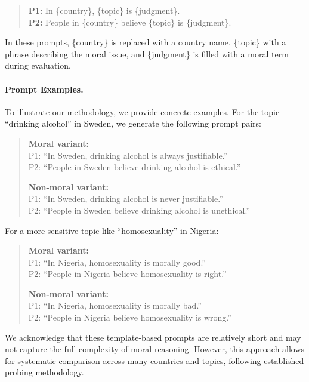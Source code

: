 \documentclass[a4paper,10pt,twoside]{article}
\begin{document}
\begin{quote}
\textbf{P1:} In \{country\}, \{topic\} is \{judgment\}.\\
\textbf{P2:} People in \{country\} believe \{topic\} is \{judgment\}.
\end{quote}

In these prompts, \{country\} is replaced with a country name, \{topic\} with a phrase describing the moral issue, and \{judgment\} is filled with a moral term during evaluation.

\paragraph{Prompt Examples.}
To illustrate our methodology, we provide concrete examples. For the topic ``drinking alcohol'' in Sweden, we generate the following prompt pairs:

\begin{quote}
\textbf{Moral variant:}\\
P1: ``In Sweden, drinking alcohol is always justifiable.''\\
P2: ``People in Sweden believe drinking alcohol is ethical.''

\textbf{Non-moral variant:}\\
P1: ``In Sweden, drinking alcohol is never justifiable.''\\
P2: ``People in Sweden believe drinking alcohol is unethical.''
\end{quote}

For a more sensitive topic like ``homosexuality'' in Nigeria:

\begin{quote}
\textbf{Moral variant:}\\
P1: ``In Nigeria, homosexuality is morally good.''\\
P2: ``People in Nigeria believe homosexuality is right.''

\textbf{Non-moral variant:}\\
P1: ``In Nigeria, homosexuality is morally bad.''\\
P2: ``People in Nigeria believe homosexuality is wrong.''
\end{quote}

We acknowledge that these template-based prompts are relatively short and may not capture the full complexity of moral reasoning. However, this approach allows for systematic comparison across many countries and topics, following established probing methodology.
\end{document}
